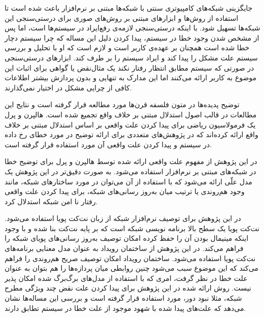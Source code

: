 جایگزینی شبکه‌های کامپیوتری سنتی با شبکه‌ها مبتنی بر نرم‌افزار%
باعث شده است تا استفاده از روش‌ها و ابزار‌های مبتنی بر روش‌های صوری%
برای درستی‌سنجی%
این شبکه‌ها تسهیل شود.
با اینکه درستی‌سنجی لازمه‌ی رفع‌ایراد در سیستم‌ها است، اما پس از مشخص شدن وجود خطا در سیستم، پیدا کردن دلیل این مساله که چرا سیستم دچار خطا شده است همچنان بر عهده‌ی کاربر است و لازم است که او با تحلیل و بررسی سیستم علت مشکل را پیدا کند و ایراد سیستم را بر طرف کند.
ابزار‌های درستی‌سنجی در صورتی که سیستم مطابق انتظار رفتار نکند یک مثال‌نقض یا گواهی برای اثبات این موضوع به کاربر ارائه می‌کنند اما این مدارک به تنهایی و بدون پردازش بیشتر اطلاعات کافی از چرایی مشکل در اختیار نمی‌گذارند.

توضیح پدیده‌ها در متون فلسفه قرن‌ها مورد مطالعه قرار گرفته است و نتایج این مطالعات در قالب اصول استدلال مبتنی بر خلاف واقع%
تجمیع شده است.
هالپرن%
و پرل%
یک فرمولاسیون ریاضی برای پیدا کردن علت واقعی%
بر اساس استدلال مبتنی بر خلاف واقع ارائه کرده‌اند که در پژوهش‌های متعددی برای ارائه توضیح در مورد خطای رخ داده در سیستم و پیدا کردن علت واقعی آن مورد استفاده قرار گرفته است.

در این پژوهش از مفهوم علت واقعی ارائه شده توسط هالپرن و پرل برای توضیح خطا در شبکه‌های مبتنی بر نرم‌افزار استفاده می‌شود.
به صورت دقیق‌تر در این پژوهش یک مدل علّی%
ارائه می‌شود که با استفاده از آن می‌توان در مورد ساختارهای شبکه، مانند وجود هم‌روندی یا ترتیب میان به‌روز رسانی‌های شبکه، برای پیدا کردن علت واقعی رفتار نا امن شبکه استدلال کرد.

در این پژوهش برای توصیف نرم‌افزار شبکه از زبان نت‌کت‌ پویا%
استفاده می‌شود.
نت‌کت پویا یک سطح‌ بالا برنامه‌ نویسی شبکه است که بر پایه نت‌کت%
 بنا شده و با وجود اینکه مینیمال بودن آن را حفظ کرده امکان توصیف به‌روز رسانی‌های پویای شبکه را فراهم می‌کند.
در این پژوهش از ساختمان رویداد%
به عنوان مدل معنایی%
برنامه‌های نت‌کت پویا استفاده می‌شود.
ساختمان رویداد امکان توصیف صریح هم‌روندی را فراهم می‌کند که این موضوع سبب می‌شود چنین روابطی میان پردازه‌ها را هم بتوان به عنوان علت خطا در نظر گرفت، امری که با استفاده از مدل‌های برگ‌برگ شده%
امکان پذیر نیست.
روش ارائه شده در این پژوهش برای پیدا کردن علت نقض چند ویژگی مطرح 
شبکه، مثلا نبود دور، مورد استفاده قرار گرفته است و بررسی این مساله‌ها نشان می‌دهد که علت‌های پیدا شده با شهود موجود از علت خطا در سیستم تطابق دارند.
